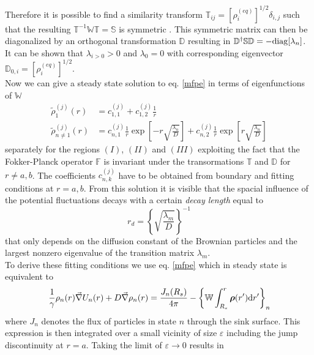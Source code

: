 \documentclass[twocolumn,superscriptaddress]{revtex4}
\newcommand{\vect}[1]{\boldsymbol{\mathbf{#1}}}
\begin{document}
Therefore it is possible to find a similarity transform $\mathbb{T}_{ij}=[\rho_i^{(eq)}]^{1/2}\delta_{i,j}$ such that the resulting $\mathbb{T}^{-1}\mathbb{W}\mathbb{T} = \mathbb{S}$ is symmetric \cite{Oppenheim1977}. This symmetric matrix can then be diagonalized by an orthogonal transformation $\mathbb{D}$ resulting in $\mathbb{D}^{\dagger}\mathbb{S}\mathbb{D} = - {\rm diag}[\lambda_n]$. It can be shown \cite{VanKampen1992} that $\lambda_{i>0}>0$ and $\lambda_0=0$ with corresponding eigenvector $\mathbb{D}_{0,i}=[\rho_i^{(eq)}]^{1/2}$.  \\
Now we can give a steady state solution to eq. \eqref{mfpe} in terms of eigenfunctions of $\mathbb{W}$
\begin{align}
    \label{solution}
    \tilde{\rho}_{1}^{(j)}(r) &= c_{1,1}^{(j)} + c_{1,2}^{(j)} \frac{1}{r} \\
    \tilde{\rho}_{n \ne 1}^{(j)}(r) &= c_{n,1}^{(j)}\frac{1}{r} \exp\left[-r\sqrt{\frac{\lambda_n}{D}}\right] + c_{n,2}^{(j)}\frac{1}{r} \exp\left[r\sqrt{\frac{\lambda_n}{D}}\right]  \nonumber
\end{align}
separately for the regions $(I)$, $(II)$ and $(III)$ exploiting the fact that the Fokker-Planck operator $\mathbb{F}$ is invariant under the transormations $\mathbb{T}$ and $\mathbb{D}$ for $r\ne a, b$. The coefficients $c^{(j)}_{n,k}$ have to be obtained from boundary and fitting conditions at $r=a,b$. From this solution it is visible that the spacial influence of the potential fluctuations decays with a certain \textit{decay length} equal to
\begin{equation}
    r_d = \left\{\sqrt{\frac{\lambda_m}{D}}\right\}^{-1}
    \label{decay_length}
\end{equation}
that only depends on the diffusion constant of the Brownian particles and the largest nonzero eigenvalue of the transition matrix $\lambda_m$.\\
To derive these fitting conditions we use eq. \eqref{mfpe} which in steady state is equivalent to
\begin{equation*}
     \frac{1}{\gamma}\rho_n(r) \vec{\nabla} U_n(r) + D \vec{\nabla} \rho_n(r) = \frac{J_n(R_s)}{4 \pi} - \left\{ \mathbb{W} \int_{R_s}^{r} \vect{\rho}(r') {\rm d} r' \right\}_{n}
\end{equation*}
where $J_n$ denotes the flux of particles in state $n$ through the sink surface. This expression is then integrated over a small vicinity of size $\varepsilon$ including the jump discontinuity at $r = a$. Taking the limit of $\varepsilon \rightarrow 0$ results in 
\end{document}
